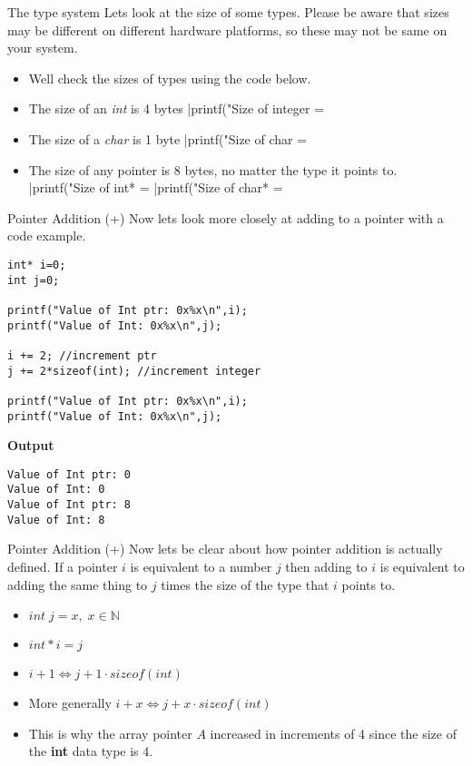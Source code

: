 \documentclass[10pt]{beamer}
\begin{document}
\begin{frame}[fragile]{The type system}
Lets look at the size of some types. Please be aware that sizes may be different on different hardware platforms, so these may not be same on your system.

\begin{itemize}[<+->]
	\item Well check the sizes of types using the code below.
	\item The size of an {\it int} is 4 bytes
	|printf("Size of integer = %
	\item The size of a {\it char} is 1 byte
	|printf("Size of char = %
	\item The size of any pointer is 8 bytes, no matter the type it points to.
	|printf("Size of int* = %
	|printf("Size of char* = %
\end{itemize}
\end{frame}

\begin{frame}[fragile]{Pointer Addition (+)}
Now lets look more closely at adding to a pointer with a code example.

\begin{verbatim}
int* i=0;
int j=0;

printf("Value of Int ptr: 0x%x\n",i);
printf("Value of Int: 0x%x\n",j);

i += 2; //increment ptr
j += 2*sizeof(int); //increment integer

printf("Value of Int ptr: 0x%x\n",i);
printf("Value of Int: 0x%x\n",j);
\end{verbatim}
{\bf Output}
\begin{verbatim}
Value of Int ptr: 0
Value of Int: 0
Value of Int ptr: 8
Value of Int: 8
\end{verbatim}
\end{frame}

\begin{frame}[fragile]{Pointer Addition (+)}
Now lets be clear about how pointer addition is actually defined. If a pointer $i$ is equivalent to a number $j$ then adding to $i$ is equivalent to adding the same thing to $j$ times the size of the type that $i$ points to.

\begin{itemize}[<+->]
	\item $int \; j = x, \; x \in \mathbb{N}$
	\item $int* i = j$
	\item $i + 1 \iff j + 1 \cdot sizeof(int)$
	\item More generally $i + x \iff j + x \cdot sizeof(int)$
	\item This is why the array pointer $A$ increased in increments of 4 since the size of the {\bf int} data type is 4.
\end{itemize}
\end{frame}
\end{document}
